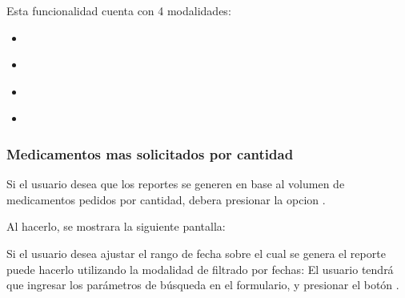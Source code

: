 \documentclass[a4paper,10pt,spanish]{sphinxmanual}
\begin{document}
Esta funcionalidad cuenta con 4 modalidades:
\begin{itemize}
\item {} 
{\hyperref[medicams:meds\string-cant\string-pc]{}}

\item {} 
{\hyperref[medicams:meds\string-ped\string-pc]{}}

\item {} 
{\hyperref[medicams:org\string-cant\string-pc]{}}

\item {} 
{\hyperref[medicams:org\string-ped\string-pc]{}}

\end{itemize}


\subsubsection{Medicamentos mas solicitados por cantidad}
\label{medicams:meds-cant-pc}\label{medicams:medicamentos-mas-solicitados-por-cantidad}
Si el usuario desea que los reportes se generen en base al volumen de medicamentos pedidos por cantidad, debera presionar la opcion .


Al hacerlo, se mostrara la siguiente pantalla:



Si el usuario desea ajustar el rango de fecha sobre el cual se genera el reporte puede hacerlo utilizando la modalidad de filtrado por fechas:
El usuario tendrá que ingresar los parámetros de búsqueda en el formulario, y presionar el botón .
\end{document}
